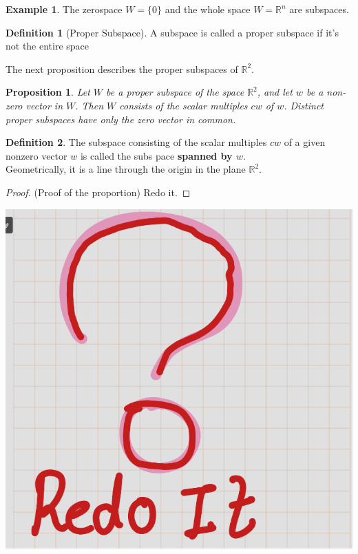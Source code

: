 \documentclass[
]{book}
\newtheorem{proposition}{Proposition}[chapter]
\theoremstyle{definition}
\newtheorem{definition}{Definition}[chapter]
\theoremstyle{definition}
\newtheorem{example}{Example}[chapter]
\theoremstyle{definition}
\theoremstyle{definition}
\theoremstyle{remark}
\begin{document}
\begin{example}
\protect\hypertarget{exm:unnamed-chunk-73}{}\label{exm:unnamed-chunk-73}The zerospace \(W = \{0\}\) and the whole space \(W = \mathbb{R}^n\) are subspaces.
\end{example}

\begin{definition}[Proper Subspace]
\protect\hypertarget{def:unnamed-chunk-74}{}\label{def:unnamed-chunk-74}A subspace is called a proper subspace if it's not the entire space
\end{definition}

The next proposition describes the proper subspaces of \(\mathbb{R}^2\).

\begin{proposition}
\protect\hypertarget{prp:unnamed-chunk-75}{}\label{prp:unnamed-chunk-75}Let \(W\) be a proper subspace of the space \(\mathbb{R}^2\), and let \(w\) be a non-zero vector in \(W\). Then \(W\) consists of the scalar multiples \(cw\) of \(w\). Distinct proper subspaces have only the zero vector in common.
\end{proposition}

\begin{definition}
\protect\hypertarget{def:unnamed-chunk-76}{}\label{def:unnamed-chunk-76}The subspace consisting of the scalar multiples \(cw\) of a given nonzero vector \(w\) is called the subs pace \textbf{spanned by \(w\)}.\\
Geometrically, it is a line through the origin in the plane \(\mathbb{R}^2\).
\end{definition}

\begin{proof}
(Proof of the proportion)
Redo it.
\end{proof}

\includegraphics{figures/ch_2/fig100.png}
\end{document}
